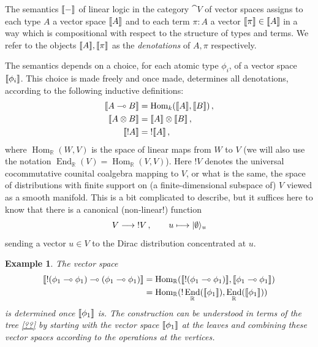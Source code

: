 \documentclass[english,letter paper,12pt,leqno]{article}
\theoremstyle{example}
\newtheorem{example}[theorem]{Example}
\numberwithin{equation}{section}
\def\Hom{\operatorname{Hom}}
\def\be{\begin{equation}}
\def\ee{\end{equation}}
\DeclareMathOperator{\End}{End}
\begin{document}
The semantics $\llbracket - \rrbracket$ of linear logic in the category $\cat{V}$ of vector spaces \cite[\S 5.1, \S 5.3]{murfet_ll} assigns to each type $A$ a vector space $\llbracket A \rrbracket$ and to each term $\pi: A$ a vector $\llbracket \pi \rrbracket \in \llbracket A \rrbracket$ in a way which is compositional with respect to the structure of types and terms. We refer to the objects $\llbracket A \rrbracket, \llbracket \pi \rrbracket$ as the \emph{denotations} of $A,\pi$ respectively. 

The semantics depends on a choice, for each atomic type $\phi_i$, of a vector space $\llbracket \phi_i \rrbracket$. This choice is made freely and once made, determines all denotations, according to the following inductive definitions:
\begin{align*}
\den{A \multimap B} &= \Hom_k(\den{A},\den{B})\,,\\
\den{A \otimes B} &= \den{A} \otimes \den{B}\,,\\
\den{{!}A} &= {!} \den{A}\,,
\end{align*}
where $\Hom_{\mathbb{R}}(W,V)$ is the space of linear maps from $W$ to $V$ (we will also use the notation $\End_{\mathbb{R}}(V) = \Hom_{\mathbb{R}}(V,V)$). Here ${!} V$ denotes the universal cocommutative counital coalgebra mapping to $V$, or what is the same, the space of distributions with finite support on (a finite-dimensional subspace of) $V$ viewed as a smooth manifold. This is a bit complicated to describe, but it suffices here to know that there is a canonical (non-linear!) function
\be\label{eq:vtobangv}
V \lto {!} V\,, \qquad u \longmapsto \ket{\emptyset}_u
\ee
sending a vector $u \in V$ to the Dirac distribution concentrated at $u$.

\begin{example}\label{example:denotation_intaphi} The vector space
\begin{align*}
\den{{!}( \phi_1 \multimap \phi_1 ) \multimap (\phi_1 \multimap \phi_1) } &= \Hom_{\mathbb{R}}( \den{{!}(\phi_1 \multimap \phi_1)}, \den{\phi_1 \multimap \phi_1})\\
&= \Hom_{\mathbb{R}}( {!} \End_{\mathbb{R}}(\den{\phi_1}), \End_{\mathbb{R}}(\den{\phi_1}))
\end{align*}
is determined once $\llbracket \phi_1 \rrbracket$ is. The construction can be understood in terms of the tree \eqref{??} by starting with the vector space $\llbracket \phi_1 \rrbracket$ at the leaves and combining these vector spaces according to the operations at the vertices.
\end{example}
\end{document}
